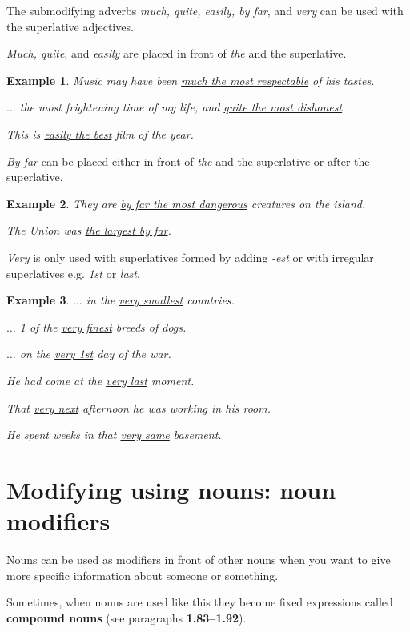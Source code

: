 \documentclass[oneside]{book}
\numberwithin{equation}{section}
\newtheorem{example}{Example}[section]
\begin{document}
%
The submodifying adverbs \textit{much, quite, easily, by far}, and \textit{very} can be used with the superlative adjectives.

%
\textit{Much, quite}, and \textit{easily} are placed in front of \textit{the} and the superlative.
\begin{example}
    Music may have been \underline{much the most respectable} of his tastes.
    
    $\ldots$ the most frightening time of my life, and \underline{quite the most dishonest}.
    
    This is \underline{easily the best} film of the year.
\end{example}
\textit{By far} can be placed either in front of \textit{the} and the superlative or after the superlative.
\begin{example}
    They are \underline{by far the most dangerous} creatures on the island.
    
    The Union was \underline{the largest by far}.
\end{example}
%
\noindent{} \textit{Very} is only used with superlatives formed by adding \textit{-est} or with irregular superlatives e.g. \textit{1st} or \textit{last}.
\begin{example}
    $\ldots$ in the \underline{very smallest} countries.
    
    $\ldots$ 1 of the \underline{very finest} breeds of dogs.
    
    $\ldots$ on the \underline{very 1st} day of the war.
    
    He had come at the \underline{very last} moment.
    
    That \underline{very next} afternoon he was working in his room.
    
    He spent weeks in that \underline{very same} basement.
\end{example}

\section{Modifying using nouns: noun modifiers}
\noindent{} Nouns can be used as modifiers in front of other nouns when you want to give more specific information about someone or something.

%
Sometimes, when nouns are used like this they become fixed expressions called \textbf{compound nouns} (see paragraphs \textbf{1.83--1.92}).
\end{document}
